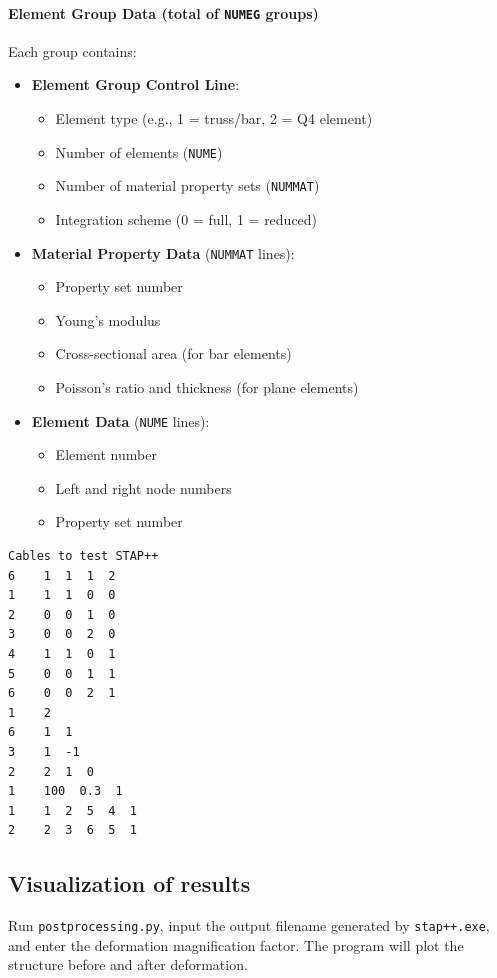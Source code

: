 \documentclass[a4paper,12pt]{report}
\begin{document}
\paragraph{Element Group Data (total of \texttt{NUMEG} groups)}  
Each group contains:
\begin{itemize}
  \item \textbf{Element Group Control Line}:
    \begin{itemize}
      \item Element type (e.g., 1 = truss/bar, 2 = Q4 element)
      \item Number of elements (\texttt{NUME})
      \item Number of material property sets (\texttt{NUMMAT})
      \item Integration scheme (0 = full, 1 = reduced)
    \end{itemize}
  \item \textbf{Material Property Data} (\texttt{NUMMAT} lines):
    \begin{itemize}
      \item Property set number
      \item Young's modulus
      \item Cross-sectional area (for bar elements)
      \item Poisson's ratio and thickness (for plane elements)
    \end{itemize}
  \item \textbf{Element Data} (\texttt{NUME} lines):
    \begin{itemize}
      \item Element number
      \item Left and right node numbers
      \item Property set number
    \end{itemize}
\end{itemize}
\begin{lstlisting}[basicstyle=\ttfamily, frame=single, caption={test1\_2.dat}]
Cables to test STAP++
6    1  1  1  2
1    1  1  0  0
2    0  0  1  0
3    0  0  2  0
4    1  1  0  1
5    0  0  1  1
6    0  0  2  1
1    2
6    1  1
3    1  -1
2    2  1  0
1    100  0.3  1
1    1  2  5  4  1
2    2  3  6  5  1
\end{lstlisting}
\subsection{Visualization of results}
Run \texttt{postprocessing.py}, input the output filename generated by \texttt{stap++.exe}, and enter the deformation magnification factor. The program will plot the structure before and after deformation.
\end{document}
